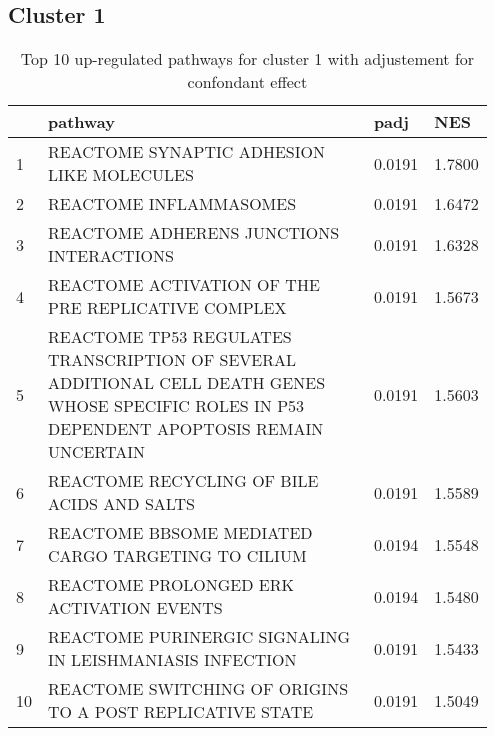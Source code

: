 \documentclass{article}
\begin{document}
\subsection{Cluster 1 }
\begin{table}[H]
\centering
\begin{tabular}{p{0.05\linewidth}p{0.7\linewidth}p{0.1\linewidth}p{0.1\linewidth}}
  \hline
 & pathway & padj & NES \\ 
  \hline
1 & REACTOME SYNAPTIC ADHESION LIKE MOLECULES & 0.0191 & 1.7800 \\ 
  2 & REACTOME INFLAMMASOMES & 0.0191 & 1.6472 \\ 
  3 & REACTOME ADHERENS JUNCTIONS INTERACTIONS & 0.0191 & 1.6328 \\ 
  4 & REACTOME ACTIVATION OF THE PRE REPLICATIVE COMPLEX & 0.0191 & 1.5673 \\ 
  5 & REACTOME TP53 REGULATES TRANSCRIPTION OF SEVERAL ADDITIONAL CELL DEATH GENES WHOSE SPECIFIC ROLES IN P53 DEPENDENT APOPTOSIS REMAIN UNCERTAIN & 0.0191 & 1.5603 \\ 
  6 & REACTOME RECYCLING OF BILE ACIDS AND SALTS & 0.0191 & 1.5589 \\ 
  7 & REACTOME BBSOME MEDIATED CARGO TARGETING TO CILIUM & 0.0194 & 1.5548 \\ 
  8 & REACTOME PROLONGED ERK ACTIVATION EVENTS & 0.0194 & 1.5480 \\ 
  9 & REACTOME PURINERGIC SIGNALING IN LEISHMANIASIS INFECTION & 0.0191 & 1.5433 \\ 
  10 & REACTOME SWITCHING OF ORIGINS TO A POST REPLICATIVE STATE & 0.0191 & 1.5049 \\ 
   \hline
\end{tabular}
\caption{Top 10 up-regulated pathways for cluster 1 with adjustement for confondant effect} 
\label{tab:q3_2_conf_1}
\end{table}
\end{document}
